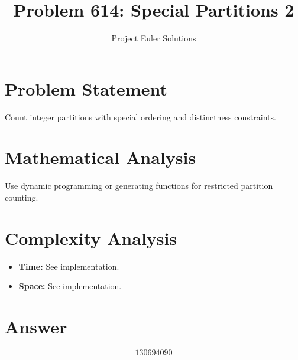 \documentclass[11pt]{article}
\title{Problem 614: Special Partitions 2}
\author{Project Euler Solutions}
\date{}
\begin{document}
\maketitle

\section{Problem Statement}
Count integer partitions with special ordering and distinctness constraints.

\section{Mathematical Analysis}
Use dynamic programming or generating functions for restricted partition counting.

\section{Complexity Analysis}
\begin{itemize}
    \item \textbf{Time:} See implementation.
    \item \textbf{Space:} See implementation.
\end{itemize}

\section{Answer}

\[
\boxed{130694090}
\]
\end{document}

